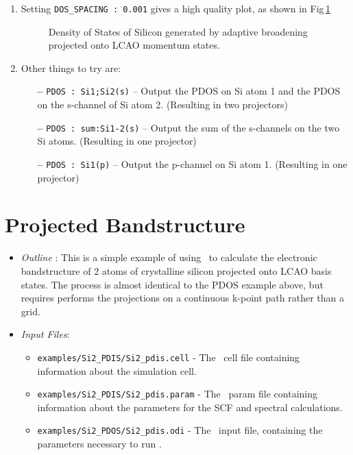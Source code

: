 \documentclass[a4paper,11pt,twoside]{book}
\begin{document}
{\begin{enumerate}
\verb#xmgrace -nxy Si2.pdos.dat#

\item Setting {\tt DOS\_SPACING : 0.001} gives a high quality plot, as shown in Fig\,\ref{fig:Si2_PDOS}

\begin{figure}[h]
\begin{center}
\caption{Density of States of Silicon generated by adaptive broadening projected onto LCAO momentum states.}
\label{fig:Si2_PDOS}
\end{center}
\end{figure}


\item Other things to try are:
\begin{itemize}
\item[{\bf --}]  \verb#PDOS : Si1;Si2(s)#  -- Output the PDOS on Si atom 1 and the PDOS on the s-channel of Si atom 2. (Resulting in two projectors)
\item[{\bf --}]  \verb#PDOS : sum:Si1-2(s)#  --  Output the sum of the s-channels on the two Si atoms. (Resulting in one projector)
\item[{\bf --}]  \verb#PDOS : Si1(p)# -- Output the p-channel on Si atom 1. (Resulting in one projector)
\end{itemize}
\end{enumerate}

\section{Projected Bandstructure}

\begin{itemize}
\item \emph{Outline} : This is a simple example of using \optados\ to calculate the electronic bandstructure of 2 atoms of crystalline silicon projected onto LCAO basis states. The process is almost identical to the PDOS example above, but requires performs the projections on a continuous k-point path rather than a grid.

\item \emph{Input Files}:
\begin{itemize}
\item \verb#examples/Si2_PDIS/Si2_pdis.cell# - The \castep\ cell file containing information about the simulation cell.
\item \verb#examples/Si2_PDIS/Si2_pdis.param# - The \castep\ param file containing information about the parameters for the SCF and spectral calculations.
\item \verb#examples/Si2_PDOS/Si2_pdis.odi# - The \optados\ input file, containing the parameters necessary to run \optados.
\end{itemize}
\end{itemize}

}
\end{document}
